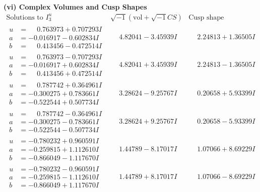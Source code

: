 \documentclass[1p]{elsarticle_modified}
\theoremstyle{definition}
\newcommand{\I}{\sqrt{-1}}
\begin{document}
\newpage\flushleft \textbf{(vi) Complex Volumes and Cusp Shapes}
$$\begin{array}{c|c|c}  
\text{Solutions to }I^u_{3}& \I (\text{vol} + \sqrt{-1}CS) & \text{Cusp shape}\\
 \hline 
\begin{aligned}
u &= \phantom{-}0.763973 + 0.707293 I \\
a &= -0.016917 - 0.602834 I \\
b &= \phantom{-}0.413456 - 0.472514 I\end{aligned}
 & \phantom{-}4.82041 - 3.45939 I & \phantom{-}2.24813 + 1.36505 I \\ \hline\begin{aligned}
u &= \phantom{-}0.763973 - 0.707293 I \\
a &= -0.016917 + 0.602834 I \\
b &= \phantom{-}0.413456 + 0.472514 I\end{aligned}
 & \phantom{-}4.82041 + 3.45939 I & \phantom{-}2.24813 - 1.36505 I \\ \hline\begin{aligned}
u &= \phantom{-}0.787742 + 0.364961 I \\
a &= -0.300275 + 0.783661 I \\
b &= -0.522544 + 0.507734 I\end{aligned}
 & \phantom{-}3.28624 - 9.25767 I & \phantom{-}0.20658 + 5.93399 I \\ \hline\begin{aligned}
u &= \phantom{-}0.787742 - 0.364961 I \\
a &= -0.300275 - 0.783661 I \\
b &= -0.522544 - 0.507734 I\end{aligned}
 & \phantom{-}3.28624 + 9.25767 I & \phantom{-}0.20658 - 5.93399 I \\ \hline\begin{aligned}
u &= -0.780232 + 0.960591 I \\
a &= -0.259815 + 1.112610 I \\
b &= -0.866049 - 1.117670 I\end{aligned}
 & \phantom{-}1.44789 - 8.17017 I & \phantom{-}1.07066 + 8.69229 I \\ \hline\begin{aligned}
u &= -0.780232 - 0.960591 I \\
a &= -0.259815 - 1.112610 I \\
b &= -0.866049 + 1.117670 I\end{aligned}
 & \phantom{-}1.44789 + 8.17017 I & \phantom{-}1.07066 - 8.69229 I \\ \hline\begin{aligned}

\end{aligned}
\end{array}$$
\end{document}
